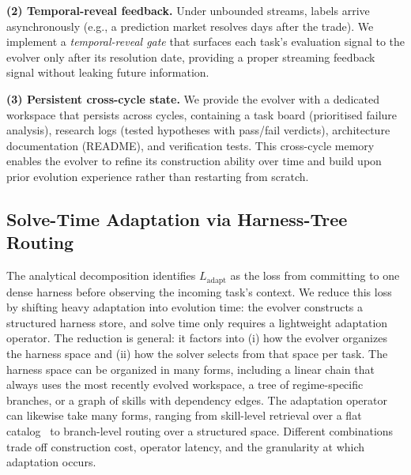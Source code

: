 \documentclass[11pt]{article}
\theoremstyle{plain}
\newcommand{\Ladapt}{L_{\text{adapt}}}
\begin{document}
\noindent\textbf{(2) Temporal-reveal feedback.}
Under unbounded streams, labels arrive asynchronously (e.g., a prediction market resolves days after the trade). We implement a \emph{temporal-reveal gate} that surfaces each task's evaluation signal to the evolver only after its resolution date, providing a proper streaming feedback signal without leaking future information.

\noindent\textbf{(3) Persistent cross-cycle state.}
We provide the evolver with a dedicated workspace that persists across cycles, containing a task board (prioritised failure analysis), research logs (tested hypotheses with pass/fail verdicts), architecture documentation (README), and verification tests. This cross-cycle memory enables the evolver to refine its construction ability over time and build upon prior evolution experience rather than restarting from scratch.




\subsection{Solve-Time Adaptation via Harness-Tree Routing}
\label{sec:method-nav}

The analytical decomposition identifies $\Ladapt$ as the loss from committing to one dense harness before observing the incoming task's context. We reduce this loss by shifting heavy adaptation into evolution time: the evolver constructs a structured harness store, and solve time only requires a lightweight adaptation operator. The reduction is general: it factors into (i) how the evolver organizes the harness space and (ii) how the solver selects from that space per task. The harness space can be organized in many forms, including a linear chain that always uses the most recently evolved workspace, a tree of regime-specific branches, or a graph of skills with dependency edges. The adaptation operator can likewise take many forms, ranging from skill-level retrieval over a flat catalog~\cite{deerflow2025} to branch-level routing over a structured space. Different combinations trade off construction cost, operator latency, and the granularity at which adaptation occurs.
\end{document}
